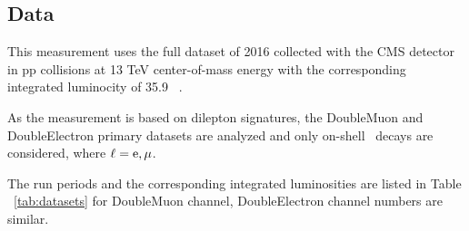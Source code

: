 
\subsection{Data}
This measurement uses the full dataset of 2016 collected with the CMS detector in pp collisions
at 13 TeV center-of-mass energy with the corresponding integrated luminocity of 35.9 ~\fbinv. 

As the measurement is based on dilepton signatures, the DoubleMuon and DoubleElectron primary
datasets are analyzed and only on-shell \Zll~decays are considered, where $\ell=\mathrm{e}, {\mu}$.
 
The run periods and the corresponding integrated luminosities are listed in Table ~\ref{tab:datasets} for DoubleMuon channel, DoubleElectron channel numbers are similar.
\begin{table}[htbp]
\caption{List of used 2016 DoubleMuon data sets.
An uncertainty of $2.5\%$ is  assigned for the 2016 data set luminosity~\cite{lumiUnc}}

\label{tab:datasets}
\begin{center}
\end{center}
\end{table}

